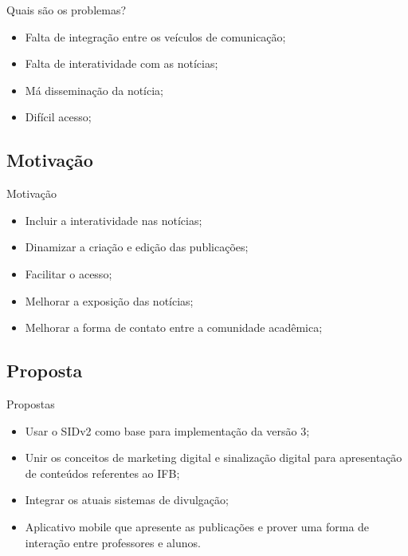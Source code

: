 \documentclass{aula-ifb}
\begin{document}
\begin{frame}{Quais são os problemas?}
\begin{itemize}
   \item Falta de integração entre os veículos de comunicação;
   \vspace{10px}
   \item Falta de interatividade com as notícias;
   \vspace{10px}
   \item Má disseminação da notícia;
   \vspace{10px}
   \item Difícil acesso;
\end{itemize}	 
\end{frame}

\subsection{Motivação}
\begin{frame}{Motivação}
	\begin{itemize}
		\item Incluir a interatividade nas notícias;
		\vspace{10px}		
		\item Dinamizar a criação e edição das publicações;
		\vspace{10px}		
		\item Facilitar o acesso;
		\vspace{10px}
		\item Melhorar a exposição das notícias;
		\vspace{10px}
		\item Melhorar a forma de contato entre a comunidade acadêmica;
	\end{itemize}
\end{frame}

\subsection{Proposta}
\begin{frame}{Propostas}
	\begin{itemize}
		\item Usar o SIDv2 como base para implementação da versão 3;
		\vspace{10px}
		\item Unir os conceitos de marketing digital e sinalização digital para apresentação de conteúdos referentes ao IFB;
		\vspace{10px}
		\item Integrar os atuais sistemas de divulgação;
		\vspace{10px}
		\item Aplicativo mobile que apresente as publicações e prover uma forma de interação entre professores e alunos.
	\end{itemize}
\end{frame}
\end{document}
